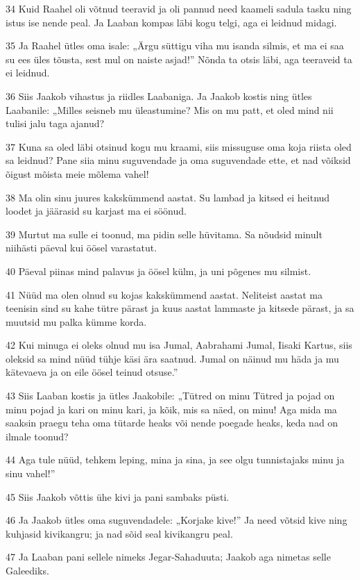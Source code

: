 \par 34 Kuid Raahel oli võtnud teeravid ja oli pannud need kaameli sadula tasku ning istus ise nende peal. Ja Laaban kompas läbi kogu telgi, aga ei leidnud midagi.
\par 35 Ja Raahel ütles oma isale: „Ärgu süttigu viha mu isanda silmis, et ma ei saa su ees üles tõusta, sest mul on naiste asjad!” Nõnda ta otsis läbi, aga teeraveid ta ei leidnud.
\par 36 Siis Jaakob vihastus ja riidles Laabaniga. Ja Jaakob kostis ning ütles Laabanile: „Milles seisneb mu üleastumine? Mis on mu patt, et oled mind nii tulisi jalu taga ajanud?
\par 37 Kuna sa oled läbi otsinud kogu mu kraami, siis missuguse oma koja riista oled sa leidnud? Pane siia minu suguvendade ja oma suguvendade ette, et nad võiksid õigust mõista meie mõlema vahel!
\par 38 Ma olin sinu juures kakskümmend aastat. Su lambad ja kitsed ei heitnud loodet ja jäärasid su karjast ma ei söönud.
\par 39 Murtut ma sulle ei toonud, ma pidin selle hüvitama. Sa nõudsid minult niihästi päeval kui öösel varastatut.
\par 40 Päeval piinas mind palavus ja öösel külm, ja uni põgenes mu silmist.
\par 41 Nüüd ma olen olnud su kojas kakskümmend aastat. Neliteist aastat ma teenisin sind su kahe tütre pärast ja kuus aastat lammaste ja kitsede pärast, ja sa muutsid mu palka kümme korda.
\par 42 Kui minuga ei oleks olnud mu isa Jumal, Aabrahami Jumal, Iisaki Kartus, siis oleksid sa mind nüüd tühje käsi ära saatnud. Jumal on näinud mu häda ja mu kätevaeva ja on eile öösel teinud otsuse.”
\par 43 Siis Laaban kostis ja ütles Jaakobile: „Tütred on minu Tütred ja pojad on minu pojad ja kari on minu kari, ja kõik, mis sa näed, on minu! Aga mida ma saaksin praegu teha oma tütarde heaks või nende poegade heaks, keda nad on ilmale toonud?
\par 44 Aga tule nüüd, tehkem leping, mina ja sina, ja see olgu tunnistajaks minu ja sinu vahel!”
\par 45 Siis Jaakob võttis ühe kivi ja pani sambaks püsti.
\par 46 Ja Jaakob ütles oma suguvendadele: „Korjake kive!” Ja need võtsid kive ning kuhjasid kivikangru; ja nad sõid seal kivikangru peal.
\par 47 Ja Laaban pani sellele nimeks Jegar-Sahaduuta; Jaakob aga nimetas selle Galeediks.
